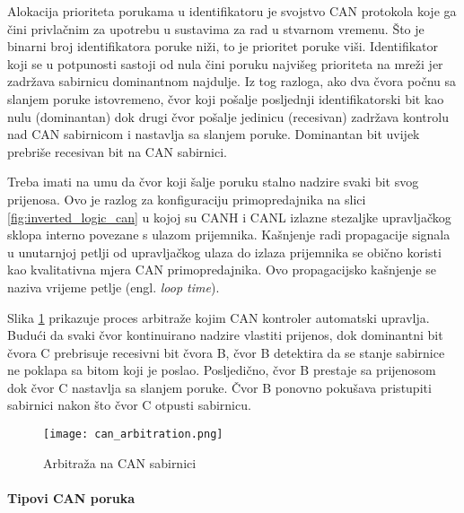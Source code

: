 Alokacija prioriteta porukama u identifikatoru je svojstvo CAN protokola koje ga čini privlačnim za upotrebu u sustavima za rad u stvarnom vremenu. Što je binarni broj identifikatora poruke niži, to je prioritet poruke viši. Identifikator koji se u potpunosti sastoji od nula čini poruku najvišeg prioriteta na mreži jer zadržava sabirnicu dominantnom najdulje. Iz tog razloga, ako dva čvora počnu sa slanjem poruke istovremeno, čvor koji pošalje posljednji identifikatorski bit kao nulu (dominantan) dok drugi čvor pošalje jedinicu (recesivan) zadržava kontrolu nad CAN sabirnicom i nastavlja sa slanjem poruke. Dominantan bit uvijek prebriše recesivan bit na CAN sabirnici.

Treba imati na umu da čvor koji šalje poruku stalno nadzire svaki bit svog prijenosa. Ovo je razlog za konfiguraciju primopredajnika na slici \ref{fig:inverted_logic_can} u kojoj su CANH i CANL izlazne stezaljke upravljačkog sklopa interno povezane s ulazom prijemnika. Kašnjenje radi propagacije signala u unutarnjoj petlji od upravljačkog ulaza do izlaza prijemnika se obično koristi kao kvalitativna mjera CAN primopredajnika. Ovo propagacijsko kašnjenje se naziva vrijeme petlje (engl. \textit{loop time}).

Slika \ref{fig:can_arbitration} prikazuje proces arbitraže kojim CAN kontroler automatski upravlja. Budući da svaki čvor kontinuirano nadzire vlastiti prijenos, dok dominantni bit čvora C prebrisuje recesivni bit čvora B, čvor B detektira da se stanje sabirnice ne poklapa sa bitom koji je poslao. Posljedično, čvor B prestaje sa prijenosom dok čvor C nastavlja sa slanjem poruke. Čvor B ponovno pokušava pristupiti sabirnici nakon što čvor C otpusti sabirnicu.

\begin{figure}[H]
	\centering
	\texttt{[image: can\_arbitration.png]}
	\caption{Arbitraža na CAN sabirnici \cite[str. 5]{can_manual}}
	\label{fig:can_arbitration}
\end{figure}

\paragraph{Tipovi CAN poruka}

